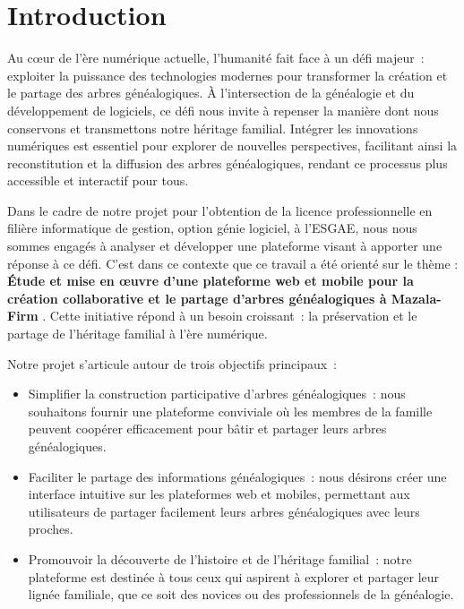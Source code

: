 \chapter*{Introduction}
\label{chap:introduction}
Au cœur de l’ère numérique actuelle, l’humanité fait face à un défi majeur :
exploiter la puissance des technologies modernes pour transformer la création
et le partage des arbres généalogiques. À l’intersection de la généalogie et
du développement de logiciels, ce défi nous invite à repenser la
manière dont nous conservons et transmettons notre héritage familial.
Intégrer les innovations numériques est essentiel pour explorer de nouvelles
perspectives, facilitant ainsi la reconstitution et la diffusion des arbres
généalogiques, rendant ce processus plus accessible et interactif pour tous.

Dans le cadre de notre projet pour l’obtention de la licence professionnelle en
filière informatique de gestion, option génie logiciel, à l’\ac{ESGAE}, nous nous
sommes engagés à analyser et développer une plateforme visant à apporter une
réponse à ce défi. C'est dans ce contexte que ce travail a été orienté sur le thème :
\textbf {\og Étude et mise en œuvre d’une plateforme web et mobile pour la
création collaborative et le partage d’arbres généalogiques à Mazala-Firm \fg}.
Cette initiative répond à un besoin croissant : la préservation et le partage de l’héritage
familial à l’ère numérique.

Notre projet s’articule autour de trois objectifs principaux :
\begin{itemize}
  \item Simplifier la construction participative d’arbres généalogiques :
    nous souhaitons fournir une plateforme conviviale où les membres de
    la famille peuvent coopérer efficacement pour bâtir et partager leurs
    arbres généalogiques.

  \item Faciliter le partage des informations généalogiques : nous désirons
    créer une interface intuitive sur les plateformes web et mobiles,
    permettant aux utilisateurs de partager facilement leurs arbres
    généalogiques avec leurs proches.

  \item Promouvoir la découverte de l’histoire et de l’héritage familial :
    notre plateforme est destinée à tous ceux qui aspirent à explorer et
    partager leur lignée familiale, que ce soit des novices ou des
    professionnels de la généalogie.
\end{itemize}


